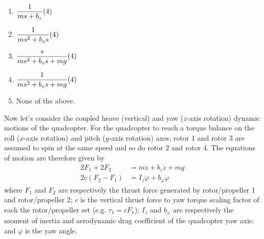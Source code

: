 \documentclass{article}
\begin{document}
\begin{enumerate}
    \begin{enumerate}[label=\alph*.]
        \item $\dfrac{1}{ms+b_z} \hfill (4)$
        \vspace{2mm}

        \item $\dfrac{1}{ms^2+b_z s} \hfill (4)$
        \vspace{2mm}

        \item $\dfrac{s}{ms^2+b_z s+mg} \hfill (4)$
        \vspace{2mm}

        \item $\dfrac{1}{ms^2+b_z s+mg} \hfill (4)$
        \vspace{2mm}

        \item None of the above.
    \end{enumerate}
\end{enumerate}

\vspace{0.5cm}

Now let's consider the coupled heave (vertical) and yaw ($z$-axis rotation) dynamic motions of the quadcopter. For the quadcopter to reach a torque balance on the roll ($x$-axis rotation) and pitch ($y$-axis rotation) axes, rotor 1 and rotor 3 are assumed to spin at the same speed and so do rotor 2 and rotor 4. The equations of motion are therefore given by
\begin{align}
2F_1 + 2F_2 &= m\ddot{z} + b_z \dot{z} + mg \\
2c(F_2 - F_1) &= I_z \ddot{\varphi} + b_{\varphi}\dot{\varphi}
\end{align}
where $F_1$ and $F_2$ are respectively the thrust force generated by rotor/propeller 1 and rotor/propeller 2; $c$ is the vertical thrust force to yaw torque scaling factor of each the rotor/propeller set (e.g. $\tau_1 = cF_1$); $I_z$ and $b_{\varphi}$ are respectively the moment of inertia and aerodynamic drag coefficient of the quadcopter yaw axis; and $\varphi$ is the yaw angle.
\end{document}
